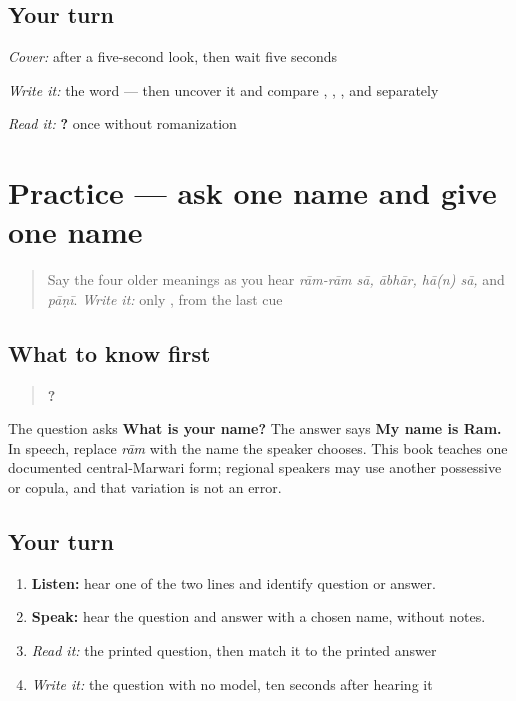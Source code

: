 \subsection*{Your turn}
\emph{Cover:} \textbf{} after a five-second look, then wait five seconds

\emph{Write it:} the word — then uncover it and compare \textbf{}, \textbf{}, \textbf{}, and \textbf{} separately

\begin{tcolorbox}[breakable,colback=teal!4,colframe=teal!35!black,title={Before you move on}]
\emph{Read it:} \textbf{   ?} once without romanization
\end{tcolorbox}
\section[Practice]{Practice — ask one name and give one name}

\label{lesson:MW-C05-practice}



\begin{quote}
Say the four older meanings as you hear \emph{rām-rām sā, ābhār, hā(n) sā,} and \emph{pāṇī}. \emph{Write it:} only \textbf{}, from the last cue
\end{quote}

\subsection*{What to know first}
\begin{quote}
\textbf{   ?}
\end{quote}

\begin{quote}
\textbf{   }
\end{quote}

The question asks \textbf{What is your name?} The answer says \textbf{My name is Ram.} In speech, replace \emph{rām} with the name the speaker chooses. This book teaches one documented central-Marwari form; regional speakers may use another possessive or copula, and that variation is not an error.

\subsection*{Your turn}
\begin{enumerate}
\raggedright
  \item \textbf{Listen:} hear one of the two lines and identify question or answer.
  \item \textbf{Speak:} hear the question and answer with a chosen name, without notes.
  \item \emph{Read it:} the printed question, then match it to the printed answer
  \item \emph{Write it:} the question with no model, ten seconds after hearing it
\end{enumerate}

